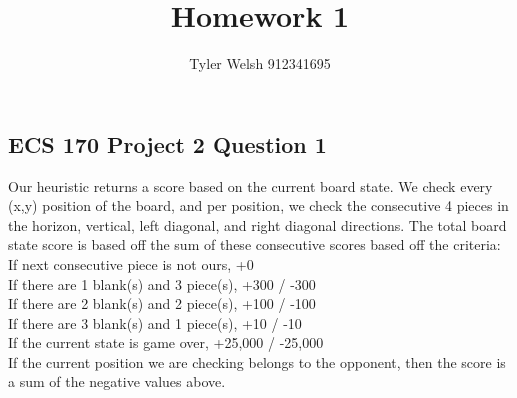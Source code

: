 \documentclass[11pt]{article}  %
\title{\textbf{Homework 1}}
\author{Tyler Welsh 912341695}
\date{}
\begin{document}

\thispagestyle{first}

\begin{center}
\section*{ECS 170 Project 2 Question 1}
\end{center}
Our heuristic returns a score based on the current board state. We check every (x,y) position of the board, and per position, we check the consecutive 4 pieces in the horizon, vertical, left diagonal, and right diagonal directions. The total board state score is based off the sum of these consecutive scores based off the criteria:\\
If next consecutive piece is not ours, +0\\
If there are 1 blank(s) and 3 piece(s), +300 / -300\\
If there are 2 blank(s) and 2 piece(s), +100 / -100\\
If there are 3 blank(s) and 1 piece(s), +10 / -10\\
If the current state is game over, +25,000 / -25,000\\
If the current position we are checking belongs to the opponent, then the score is a sum of the negative values above.
\end{document}
